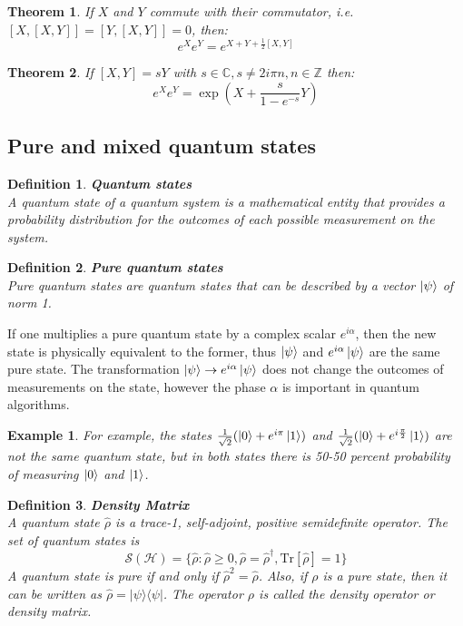 \documentclass[12pt, a4paper,  nobibnotes]{article}
\newcommand{\ketbra}[2]{|#1\rangle\langle#2|}
\newcommand{\Tr}[1]{\mathrm{Tr}\left[#1\right]}
\newtheorem*{example*}{Example}
\newtheorem{theorem}{Theorem}
\newtheorem{definition}{Definition}
\begin{document}
\begin{theorem}
    If $X$ and $Y$ commute with their commutator, i.e. $[X, [X,Y]] = [Y, [X,Y]] = 0$, then:
    \begin{equation*}
        e^Xe^Y = e^{X+Y+\frac{1}{2}[X,Y]}
    \end{equation*}
\end{theorem}

\begin{theorem}
    If $[X,Y] = sY$ with $s\in\mathbb{C}, s\neq 2i\pi n, n\in \mathbb Z$ then:
    \begin{equation*}
        e^Xe^Y = \exp\left(X + \frac{s}{1-e^{-s}}Y \right)
    \end{equation*}
\end{theorem}

\subsection{Pure and mixed quantum states}
\label{appendix:pure-and-mixed-states}
\begin{definition}
    \textbf{Quantum states}\\
    A quantum state of a quantum system is a mathematical entity that provides a probability distribution 
    for the outcomes of each possible measurement on the system.
\end{definition}

\begin{definition}
    \textbf{Pure quantum states}\\
    Pure quantum states are quantum states that can be described by a vector $\ket\psi$ of norm 1. 
\end{definition}
If one multiplies a pure quantum state by a complex scalar $e^{i\alpha}$, then the new state is 
physically equivalent to the former, thus $\ket\psi$ and $e^{i\alpha}\ket\psi$ are 
the same pure state.
The transformation $\ket\psi\rightarrow e^{i\alpha}\ket\psi$ does not change the outcomes of measurements on the state,
however the phase $\alpha$ is important in quantum algorithms.
\begin{example*}
    For example, the states $\frac{1}{\sqrt 2}(\ket 0 + e^{i\pi}\ket 1)$ and $\frac{1}{\sqrt 2}(\ket 0 + e^{i\frac{\pi}{2}}\ket 1)$
    are not the same quantum state, but in both states there is 50-50 percent probability of measuring $\ket 0$ and $\ket 1$.
\end{example*}

\begin{definition}
    \textbf{Density Matrix}\\
    A quantum state $\hat\rho$ is a trace-1, self-adjoint, positive semidefinite operator.
    The set of quantum states is
    \begin{equation*}
        \mathcal{S(H)} = \{ \hat\rho : \hat\rho \geq 0, \hat\rho=\hat\rho^{\dagger}, \Tr{\hat\rho} = 1 \}
    \end{equation*}
    A quantum state is pure if and only if $\hat\rho^2=\hat\rho$. 
    Also, if $\rho$ is a pure state, then it can be written as $\hat\rho = \ketbra{\psi}{\psi}$.
    The operator $\rho$ is called the \textit{density operator} or \textit{density matrix}.
    \label{def:densityop}
\end{definition}
\end{document}
